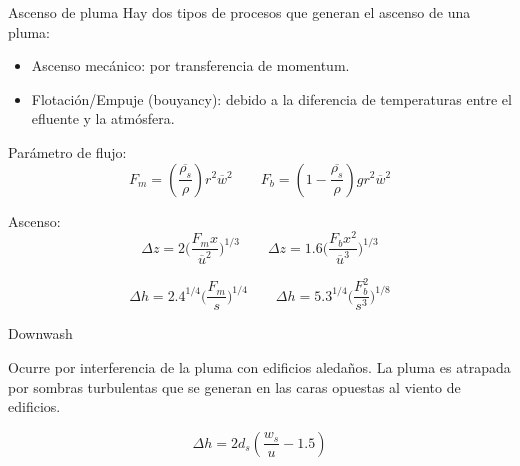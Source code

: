 \subtitle{Interacción de la pluma con el entorno}
 \begin{frame}{}
     \maketitle
 \end{frame}



\begin{frame}{Ascenso de pluma}
Hay dos tipos de procesos que generan el ascenso de una pluma:
\begin{itemize}
    \item Ascenso mecánico: por transferencia de momentum.
    \item Flotación/Empuje (bouyancy): debido a la diferencia de temperaturas entre el efluente y la atmósfera.
\end{itemize}


Parámetro de flujo:
    $$ F_m = (\frac{\overline{\rho_s}}{\rho}) r^2 \overline{w}^2   \qquad F_b = (1-\frac{\overline{\rho_s}}{\rho})g r^2 \overline{w}^2  $$
    
Ascenso:
    $$ \Delta z = 2 \bigg( \dfrac{F_m x}{\overline{u}^2} \bigg)^{1/3} \qquad    \Delta z = 1.6 \bigg( \dfrac{F_b x^2}{\overline{u}^3}  \bigg)^{1/3}    $$
    
    $$ \Delta h = 2.4^{1/4} \bigg( \dfrac{F_m}{s}\bigg)^{1/4}  \qquad  \Delta h = 5.3^{1/4} \bigg( \dfrac{F_b^2}{s^3} \bigg)^{1/8} $$
    
\end{frame}


    
    
    

\begin{frame}{Downwash}
    
    Ocurre por interferencia de la pluma con edificios aledaños.
    La pluma es atrapada por sombras turbulentas que se generan en las caras opuestas al viento de edificios.
    
    $$ \Delta h = 2 d_{s} ( \dfrac{w_s}{u} - 1.5 ) $$
    
\end{frame}


